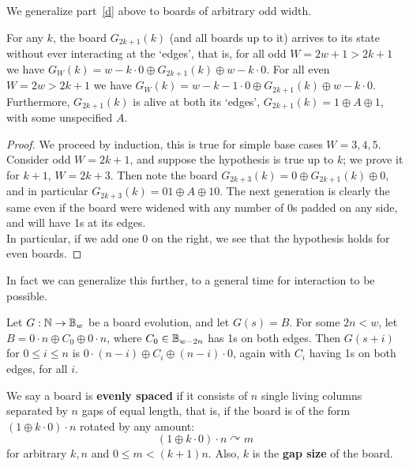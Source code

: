 \documentclass[12pt,letterpaper]{article}
\begin{document}
\noindent We generalize part~\ref{d} above to boards of arbitrary odd width.
\begin{prop}\label{OddBoardFirstEdge} %
  For any $k$, the board $G_{2k+1}(k)$ (and all boards up to it) arrives to its state without ever interacting at the `edges', that is, for all odd $W=2w+1>2k+1$ we have $G_W(k) = w-k \cdot 0 \oplus G_{2k+1}(k)\oplus w-k\cdot 0$. For all even $W=2w>2k+1$ we have $G_W(k) = w-k-1\cdot 0 \oplus G_{2k+1}(k)\oplus w-k\cdot 0$. \\
  Furthermore, $G_{2k+1}(k)$ is alive at both its `edges', $G_{2k+1}(k)=1\oplus A\oplus 1$, with some unspecified $A$.
\end{prop}
\begin{proof}
  
  We proceed by induction, this is true for simple base cases $W=3,4,5$. Consider odd $W=2k+1$, and suppose the hypothesis is true up to $k$; we prove it for $k+1$, $W=2k+3$. Then note the board $G_{2k+3}(k)=0\oplus G_{2k+1}(k)\oplus 0$, and in particular $G_{2k+3}(k)=01\oplus A\oplus 10$. The next generation is clearly the same even if the board were widened with any number of 0s padded on any side, and will have 1s at its edges. \\
  In particular, if we add one 0 on the right, we see that the hypothesis holds for even boards.
\end{proof}

In fact we can generalize this further, to a general time for interaction to be possible.
\begin{cor}\label{lightspeed}
  Let $G:\mathbb{N}\rightarrow \mathbb{B}_w$ be a board evolution, and let $G(s)=B$. For some $2n<w$, let $B=0\cdot n\oplus C_0 \oplus 0\cdot n$, where $C_0\in \mathbb{B}_{w-2n}$ has 1s on both edges. Then $G(s+i)$ for $0\leq i\leq n$ is $0\cdot (n-i)\oplus C_i\oplus (n-i)\cdot 0$, again with $C_i$ having 1s on both edges, for all $i$.
\end{cor}

\begin{dfn}\label{EvenlySpaced}
  We say a board is {\bf evenly spaced} if it consists of $n$ single living columns separated by $n$ gaps of equal length, that is, if the board is of the form $(1\oplus k\cdot 0)\cdot n$ rotated by any amount:
  \[(1\oplus k\cdot 0)\cdot n \curvearrowright m \]
  for arbitrary $k,n$ and $0\leq m < (k+1)n$. Also, $k$ is the {\bf gap size} of the board. 
\end{dfn}
\end{document}
